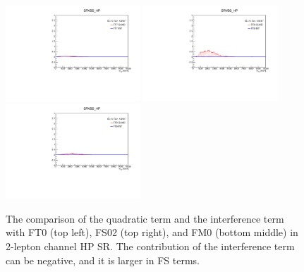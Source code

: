 \begin{figure}[]
        \includegraphics[width=0.45\textwidth]{figures/aQGC/FT7_0ptag1pfat0pjet_0ptv_SRVBS_HP_MllJ.pdf}
        \includegraphics[width=0.45\textwidth]{figures/aQGC/FT8_0ptag1pfat0pjet_0ptv_SRVBS_HP_MllJ.pdf}
        \includegraphics[width=0.45\textwidth]{figures/aQGC/FT9_0ptag1pfat0pjet_0ptv_SRVBS_HP_MllJ.pdf}
        \caption{The comparison of the quadratic term and the interference term with FT0 (top left), FS02 (top right), and FM0 (bottom middle) in 2-lepton channel HP SR. The contribution of the interference term can be negative, and it is larger in FS terms. }
        \label{fig:quadintFT}
\end{figure}
